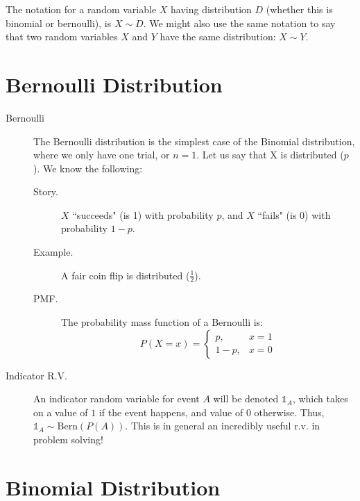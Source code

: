 \documentclass[11pt]{article}
\theoremstyle{definition}
\theoremstyle{remark}
\newcommand{\Bern}{\text{Bern}}
\newcommand{\ind}[1]{\mathds{1}_{#1}}
\begin{document}
The notation for a random variable $X$ having distribution $D$ (whether this is binomial or bernoulli), is $X \sim D$. We might also use the same notation to say that two random variables $X$ and $Y$ have the same distribution: $X \sim Y$.

\pagebreak 

\section{Bernoulli Distribution}

\begin{description}
\item[Bernoulli] The Bernoulli distribution is the simplest case of the Binomial distribution, where we only have one trial, or $n=1$. Let us say that X is distributed \Bern($p$). We know the following:
\begin{description}
	\item[Story.] $X$ ``succeeds" (is 1) with probability $p$, and $X$ ``fails" (is 0) with probability $1-p$.
	\item[Example.] A fair coin flip is distributed \Bern($\frac{1}{2}$).
	\item[PMF.] The probability mass function of a Bernoulli is:
\[P(X = x) = \begin{cases} p, & x = 1 \\ 1-p, & x = 0 \end{cases}\]
\end{description}

\item[Indicator R.V.] An indicator random variable for event $A$ will be denoted $\ind{A}$, which takes on a value of $1$ if the event happens, and value of $0$ otherwise. Thus, $\ind{A} \sim \Bern(P(A))$. This is in general an incredibly useful r.v. in problem solving!

\end{description}

\section{Binomial Distribution}
\end{document}
